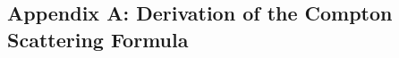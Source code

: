 \documentclass[12pt]{article}
\begin{document}
\subsection*{Appendix A: Derivation of the Compton Scattering Formula}
\begin{enumerate}
    




\end{enumerate}
\end{document}
